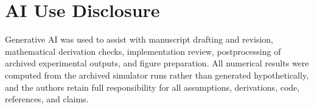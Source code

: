 \documentclass{article}
\begin{document}
\section*{AI Use Disclosure}
Generative AI was used to assist with manuscript drafting and revision, mathematical derivation checks, implementation review, postprocessing of archived experimental outputs, and figure preparation. All numerical results were computed from the archived simulator runs rather than generated hypothetically, and the authors retain full responsibility for all assumptions, derivations, code, references, and claims.
\end{document}
